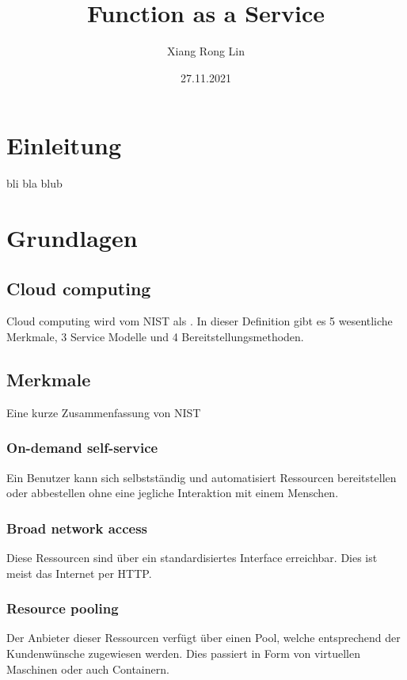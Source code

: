 \documentclass[12pt, a4paper]{article}
\title{Function as a Service}
\author{Xiang Rong Lin}
\date{27.11.2021}
\begin{document}
\maketitle



\newpage
\tableofcontents

\newpage

\section{Einleitung}
bli bla blub

\section{Grundlagen}

\subsection{Cloud computing}
Cloud computing wird vom \ac{NIST} als \cite[ein Modell zur Ermöglichung eines allgegenwärtigen, bequemen und bedarfsgerechten Netzzugang zu einem gemeinsamen Pool konfigurierbarer Rechenressourcen die schnell bereitgestellt und freigegeben werden können mit minimalem Verwaltungsaufwand oder Interaktion mit dem Dienstanbieter]{mell2011nist}.
In dieser Definition gibt es 5 wesentliche Merkmale, 3 Service Modelle und 4 Bereitstellungsmethoden.

\subsection{Merkmale}
Eine kurze Zusammenfassung von \ac{NIST}\cite{mell2011nist}
\subsubsection{On-demand self-service}
Ein Benutzer kann sich selbstständig und automatisiert Ressourcen bereitstellen oder abbestellen ohne eine jegliche Interaktion mit einem Menschen. 

\subsubsection{Broad network access}
Diese Ressourcen sind über ein standardisiertes Interface erreichbar. Dies ist meist das Internet per HTTP.

\subsubsection{Resource pooling}
Der Anbieter dieser Ressourcen verfügt über einen Pool, welche entsprechend der Kundenwünsche zugewiesen werden. Dies passiert in Form von virtuellen Maschinen oder auch Containern.
\end{document}
